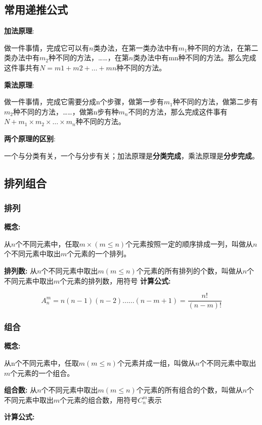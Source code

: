 \subsection{常用递推公式}

\textbf{加法原理}:

做一件事情，完成它可以有$n$类办法，在第一类办法中有$m_1$种不同的方法，在第二类办法中有$m_2$种不同的方法，……，在第$n$类办法中有mn种不同的方法。那么完成这件事共有$N=m1+m2+…+mn$种不同的方法。

\textbf{乘法原理}:

做一件事情，完成它需要分成n个步骤，做第一步有$m_1$种不同的方法，做第二步有$m_2$种不同的方法，……，做第n步有种$m_n$不同的方法，那么完成这件事有$N+m_1 \times m_2 \times … \times m_n$种不同的方法。

\textbf{两个原理的区别}:

一个与分类有关，一个与分步有关；加法原理是\textbf{分类完成}，乘法原理是\textbf{分步完成}。

\subsection{排列组合}

\subsubsection{排列}

\textbf{概念:}


从$n$个不同元素中，任取$m\times(m \leqslant n)$个元素按照一定的顺序排成一列，叫做从$n$个不同元素中取出$m$个元素的一个排列。

\textbf{排列数:}
从$n$个不同元素中取出$m(m\leqslant n)$个元素的所有排列的个数，叫做从$n$个不同元素中取出$m$个元素的排列数，用符号
\textbf{计算公式:}

$$A_n^m=n(n-1)(n-2)......(n-m+1)=\frac{n!}{(n-m)!}$$


\subsubsection{组合}

\textbf{概念:}

从n个不同元素中，任取$m(m\leqslant n)$个元素并成一组，叫做从$n$个不同元素中取出$m$个元素的一个组合。

 \textbf{组合数:}
 从$n$个不同元素中取出$m(m\leqslant n)$个元素的所有组合的个数，叫做从$n$个不同元素中取出$m$个元素的组合数，用符号$C_n^m$表示

 \textbf{计算公式:}

